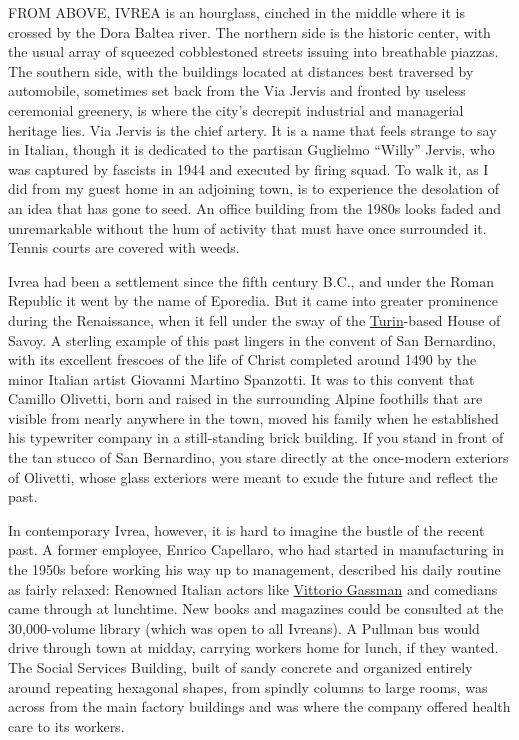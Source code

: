 FROM ABOVE, IVREA is an hourglass, cinched in the middle where it is
crossed by the Dora Baltea river. The northern side is the historic
center, with the usual array of squeezed cobblestoned streets issuing
into breathable piazzas. The southern side, with the buildings located
at distances best traversed by automobile, sometimes set back from the
Via Jervis and fronted by useless ceremonial greenery, is where the
city's decrepit industrial and managerial heritage lies. Via Jervis is
the chief artery. It is a name that feels strange to say in Italian,
though it is dedicated to the partisan Guglielmo ``Willy'' Jervis, who
was captured by fascists in 1944 and executed by firing squad. To walk
it, as I did from my guest home in an adjoining town, is to experience
the desolation of an idea that has gone to seed. An office building from
the 1980s looks faded and unremarkable without the hum of activity that
must have once surrounded it. Tennis courts are covered with weeds.

Ivrea had been a settlement since the fifth century B.C., and under the
Roman Republic it went by the name of Eporedia. But it came into greater
prominence during the Renaissance, when it fell under the sway of the
\href{https://www.nytimes.com/2017/05/10/t-magazine/travel/turin-italy-art-carol-rama-carlo-mollino-castello-di-rivoli.html}{Turin}-based
House of Savoy. A sterling example of this past lingers in the convent
of San Bernardino, with its excellent frescoes of the life of Christ
completed around 1490 by the minor Italian artist Giovanni Martino
Spanzotti. It was to this convent that Camillo Olivetti, born and raised
in the surrounding Alpine foothills that are visible from nearly
anywhere in the town, moved his family when he established his
typewriter company in a still-standing brick building. If you stand in
front of the tan stucco of San Bernardino, you stare directly at the
once-modern exteriors of Olivetti, whose glass exteriors were meant to
exude the future and reflect the past.

In contemporary Ivrea, however, it is hard to imagine the bustle of the
recent past. A former employee, Enrico Capellaro, who had started in
manufacturing in the 1950s before working his way up to management,
described his daily routine as fairly relaxed: Renowned Italian actors
like
\href{https://www.nytimes.com/2000/06/30/movies/vittorio-gassman-77-veteran-italian-star-comfortable-in-classics-and-comedy-dies.html}{Vittorio
Gassman} and comedians came through at lunchtime. New books and
magazines could be consulted at the 30,000-volume library (which was
open to all Ivreans). A Pullman bus would drive through town at midday,
carrying workers home for lunch, if they wanted. The Social Services
Building, built of sandy concrete and organized entirely around
repeating hexagonal shapes, from spindly columns to large rooms, was
across from the main factory buildings and was where the company offered
health care to its workers.

